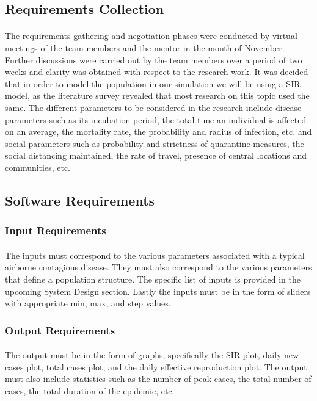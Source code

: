 \documentclass[12pt, a4paper]{extarticle}
\begin{document}
        \subsection{Requirements Collection}
            \paragraph{} The requirements gathering and negotiation phases were conducted by virtual meetings of the team members and the mentor in the month of November. Further discussions were carried out by the team members over a period of two weeks and clarity was obtained with respect to the research work. It was decided that in order to model the population in our simulation we will be using a SIR model, as the literature survey revealed that most research on this topic used the same. The different parameters to be considered in the research include disease parameters such as its incubation period, the total time an individual is affected on an average, the mortality rate, the probability and radius of infection, etc. and social parameters such as probability and strictness of quarantine measures, the social distancing maintained, the rate of travel, presence of central locations and communities, etc.
        \subsection{Software Requirements}
            \subsubsection{Input Requirements}
                \paragraph{} The inputs must correspond to the various parameters associated with a typical airborne contagious disease. They must also correspond to the various parameters that define a population structure. The specific list of inputs is provided in the upcoming System Design section. Lastly the inputs must be in the form of sliders with appropriate min, max, and step values.
            \subsubsection{Output Requirements}
                \paragraph{} The output must be in the form of graphs, specifically the SIR plot, daily new cases plot, total cases plot, and the daily effective reproduction plot. The output must also include statistics such as the number of peak cases, the total number of cases, the total duration of the epidemic, etc.
\end{document}
